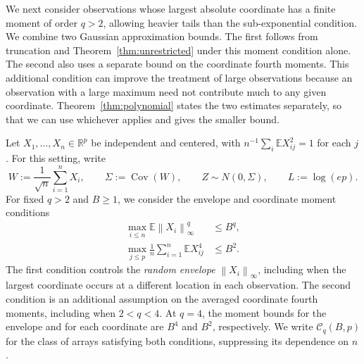 \documentclass[11pt,letterpaper]{article}
\newenvironment{recovered}{}{}
\theoremstyle{remark}
\newcommand{\E}{\mathbb E}
\newcommand{\R}{\mathbb R}
\newcommand{\Cov}{\operatorname{Cov}}
\newcommand{\norm}[1]{\left\lVert#1\right\rVert}
\begin{document}
\begin{recovered}
We next consider observations whose largest absolute coordinate has a
finite moment of order \(q>2\), allowing heavier tails than the
sub-exponential condition. We combine two Gaussian approximation
bounds. The first follows from truncation and
Theorem~\ref{thm:unrestricted} under this moment condition alone. The
second also uses a separate bound on the coordinate fourth moments.
This additional condition can improve the treatment of large
observations because an observation with a large maximum need not
contribute much to any given coordinate.
Theorem~\ref{thm:polynomial} states the two estimates separately,
so that we can use whichever applies and gives the smaller bound.
\end{recovered}

Let \(X_1,\ldots,X_n\in\R^p\) be independent and centered, with
\(n^{-1}\sum_i\E X_{ij}^2=1\) for each \(j\). For this setting, write
\begin{equation}
 W:=\frac1{\sqrt n}\sum_{i=1}^nX_i,\qquad
 \Sigma:=\Cov(W),\qquad Z\sim N(0,\Sigma),\qquad L:=\log(ep).
 \label{poly:setup}
\end{equation}
\begin{recovered}
For fixed \(q>2\) and \(B\ge1\), we consider the envelope and
coordinate moment conditions
\begin{align}
 \max_{i\le n}\E\norm{X_i}_\infty^q&\le B^q,
 \label{poly:envelope}\\
 \max_{j\le p}\frac1n\sum_{i=1}^n\E X_{ij}^4&\le B^2.
 \label{poly:fourth}
\end{align}
The first condition controls the \emph{random envelope}
\(\norm{X_i}_\infty\), including when the largest coordinate occurs
at a different location in each observation. The second condition is
an additional assumption on the averaged coordinate fourth moments,
including when \(2<q<4\). At \(q=4\), the moment bounds for
the envelope and for each coordinate are \(B^4\) and \(B^2\),
respectively. We write \(\mathcal C_q(B,p)\) for the class of arrays
satisfying both conditions, suppressing its dependence on \(n\).
\end{recovered}
\end{document}
